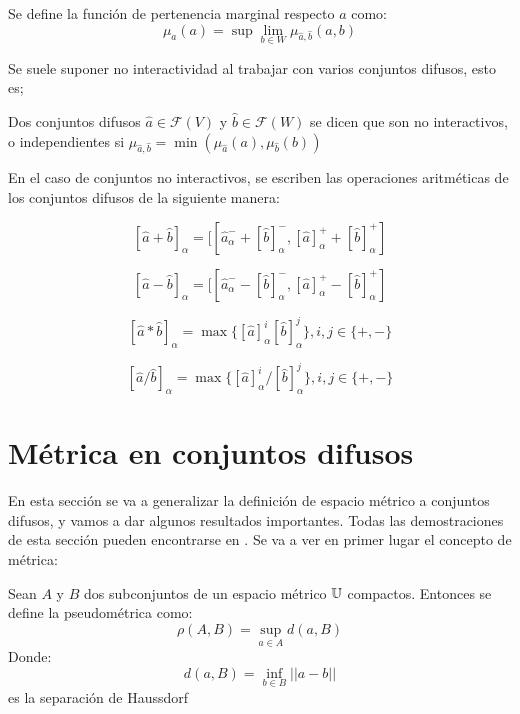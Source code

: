 \begin{definicion}
	Se define la función de pertenencia marginal respecto $a$ como:
	\[
	\mu_a(a) = \sup\lim\limits_{b \in W} \mu_{\hat{a}, \hat{b}} (a, b)
	\]
\end{definicion}

Se suele suponer no interactividad al trabajar con varios conjuntos difusos, esto es;

\begin{definicion}
	Dos conjuntos difusos $\hat{a} \in \mathcal{F}(V)$ y $\hat{b} \in \mathcal{F}(W)$ se dicen que son no interactivos, o independientes si $\mu_{\hat{a}, \hat{b}} = \min(\mu_{\hat{a}}(a), \mu_{\hat{b}}(b))$
\end{definicion}

\begin{ejemplo}
En el caso de conjuntos no interactivos, se escriben las operaciones aritméticas de los conjuntos difusos de la siguiente manera:

\[
[\hat{a} + \hat{b}]_\alpha = [[\hat{a}^-_\alpha + [\hat{b}]_\alpha^-, [\hat{a}]^+_\alpha + [\hat{b}]_\alpha^+]
\]

\[
[\hat{a} - \hat{b}]_\alpha = [[\hat{a}^-_\alpha - [\hat{b}]_\alpha^-, [\hat{a}]^+_\alpha - [\hat{b}]_\alpha^+]
\]

\[
[\hat{a} * \hat{b}]_\alpha = \max\{ [\hat{a}]_\alpha^i [\hat{b}]^j_\alpha \}, i, j \in \{+, -\}
\]

\[
[\hat{a} / \hat{b}]_\alpha = \max\{ [\hat{a}]_\alpha^i / [\hat{b}]^j_\alpha \}, i, j \in \{+, -\}
\]
\end{ejemplo}

\section{Métrica en conjuntos difusos}
En esta sección se va a generalizar la definición de espacio métrico a conjuntos difusos, y vamos a dar algunos resultados importantes. Todas las demostraciones de esta sección pueden encontrarse en \cite{apuntesfuzzy}. Se va a ver en primer lugar el concepto de métrica:

\begin{definicion}[Pseudométrica]
	Sean $A$ y $B$ dos subconjuntos de un espacio métrico $\mathbb U$ compactos. Entonces se define la pseudométrica como:
	\[
		\rho(A, B) = \sup\limits_{a \in A} d(a, B)
	\]
	Donde:
	\[
		d(a, B) = \inf\limits_{b \in B} ||a-b||
	\]
	es la separación de Haussdorf
\end{definicion}

